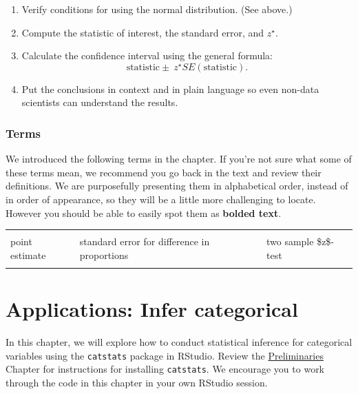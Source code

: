 \documentclass[
  10pt,
  openany]{book}
\providecommand{\tightlist}{%
  \setlength{\itemsep}{0pt}\setlength{\parskip}{0pt}}
\theoremstyle{definition}
\theoremstyle{definition}
\theoremstyle{definition}
\theoremstyle{definition}
\theoremstyle{remark}
\begin{document}
\begin{enumerate}
\def\labelenumi{\arabic{enumi}.}
\tightlist
\item
  Verify conditions for using the normal distribution. (See above.)\\
\item
  Compute the statistic of interest, the standard error, and \(z^{\star}\).\\
\item
  Calculate the confidence interval using the general formula: \[
   \mbox{statistic} \pm\ z^{\star} SE(\mbox{statistic}).
   \]
\item
  Put the conclusions in context and in plain language so even non-data scientists can understand the results.
\end{enumerate}

\subsection*{Terms}\label{terms-12}

We introduced the following terms in the chapter. If you're not sure what some of these terms mean, we recommend you go back in the text and review their definitions. We are purposefully presenting them in alphabetical order, instead of in order of appearance, so they will be a little more challenging to locate. However you should be able to easily spot them as \textbf{bolded text}.

\begin{tabu} to 
\toprule
{} &  & \\
point estimate & standard error for difference in proportions & two sample \$z\$-test\\
 &  & \\
\bottomrule
\end{tabu}

\chapter{Applications: Infer categorical}\label{inference-categ-applications}

In this chapter, we will explore how to conduct statistical inference for categorical variables using the \texttt{catstats} package in RStudio. Review the \href{rstudio}{Preliminaries} Chapter for instructions for installing \texttt{catstats}.
We encourage you to work through the code in this chapter in
your own RStudio session.
\end{document}
